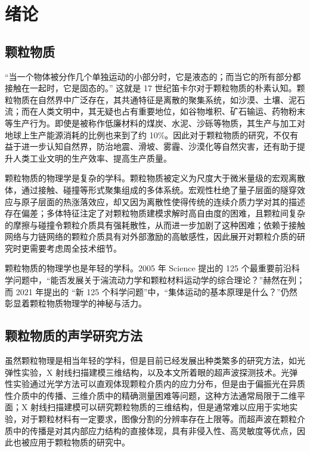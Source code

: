 
\chapter{绪论}

\section{颗粒物质}

“当一个物体被分作几个单独运动的小部分时，它是液态的；而当它的所有部分都接触在一起时，它是固态的。” 这就是 17 世纪笛卡尔对于颗粒物质的朴素认知。颗粒物质在自然界中广泛存在，其共通特征是离散的聚集系统，如沙漠、土壤、泥石流；而在人类文明中，其无疑也占有重要地位，如谷物堆积、矿石输运、药物粉末等生产行为。即使是被称作低廉材料的煤炭、水泥、沙砾等物质，其生产与加工对地球上生产能源消耗的比例也来到了约 \num{10}\%\cite{duran2000sands}。因此对于颗粒物质的研究，不仅有益于进一步认知自然界，防治地震、滑坡、雾霾、沙漠化等自然灾害，还有助于提升人类工业文明的生产效率、提高生产质量。

颗粒物质的物理学是复杂的学科。颗粒物质被定义为尺度大于微米量级的宏观离散体，通过接触、碰撞等形式聚集组成的多体系统。宏观性杜绝了量子层面的隧穿效应与原子层面的热涨落效应，却又因为离散性使得传统的连续介质力学对其的描述存在偏差\cite{RevModPhys.71.435}；多体特征注定了对颗粒物质建模求解时高自由度的困难，且颗粒间复杂的摩擦与碰撞令颗粒介质具有强耗散性，从而进一步加剧了这种困难；依赖于接触网络与力链网络的颗粒介质具有对外部激励的高敏感性，因此展开对颗粒介质的研究时更需要考虑周全技术细节。

颗粒物质的物理学也是年轻的学科。2005 年 Science 提出的 125 个最重要前沿科学问题\cite{doi:10.1126/science.309.5731.78b}中，“能否发展关于湍流动力学和颗粒材料运动学的综合理论？”赫然在列；而 2021 年提出的 “新 125 个科学问题”\cite{sanders2021125}中，“集体运动的基本原理是什么？”仍然彰显着颗粒物质物理学的神秘与活力。

\section{颗粒物质的声学研究方法}

虽然颗粒物理是相当年轻的学科，但是目前已经发展出种类繁多的研究方法，如光弹性实验\cite{photoelasticimetry}，X 射线扫描建模三维结构\cite{PhysRevE.68.020301}，以及本文所着眼的超声波探测技术。光弹性实验通过光学方法可以直观体现颗粒介质内的应力分布，但是由于偏振光在异质性介质中的传播、三维介质中的精确测量困难等问题\cite{Non-Destructive_3D_Photoelasticity}，这种方法通常局限于二维平面；X 射线扫描建模可以研究颗粒物质的三维结构，但是通常难以应用于实地实验，对于颗粒材料有一定要求，图像分割的分辨率存在上限等。而超声波在颗粒介质中的传播是对其内部应力结构的直接体现，具有非侵入性、高灵敏度等优点，因此也被应用于颗粒物质的研究中。

